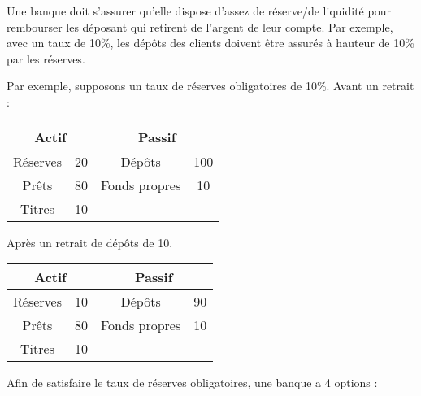 	Une banque doit s'assurer qu'elle dispose d'assez de réserve/de liquidité pour rembourser les déposant qui retirent de l'argent de leur compte. Par exemple, avec un taux de 10\%, les dépôts des clients doivent être assurés à hauteur de 10\% par les réserves.
	
	Par exemple, supposons un taux de réserves obligatoires de 10\%. Avant un retrait :
	
\begin{center}
	\begin{tabular}{|c|c|c|c|}
	\hline 
	\multicolumn{2}{|c|}{Actif} & \multicolumn{2}{|c|}{Passif} \\ 
	\hline 
	Réserves & 20 & Dépôts & 100 \\ 
	\hline 
	Prêts & 80 & Fonds propres & 10 \\ 
	\hline 
	Titres & 10 &  &  \\ 
	\hline 
	\end{tabular} 
\end{center}
	
	Après un retrait de dépôts de 10.
	
\begin{center}
		\begin{tabular}{|c|c|c|c|}
	\hline 
	\multicolumn{2}{|c|}{Actif} & \multicolumn{2}{|c|}{Passif} \\ 
	\hline 
	Réserves & 10 & Dépôts & 90 \\ 
	\hline 
	Prêts & 80 & Fonds propres & 10 \\ 
	\hline 
	Titres & 10 &  &  \\ 
	\hline 
	\end{tabular}
	\end{center}	
	
	Afin de satisfaire le taux de réserves obligatoires, une banque a 4 options :
	
